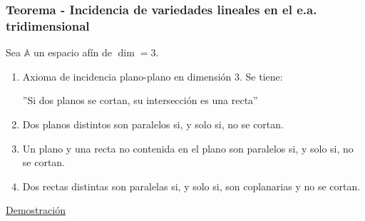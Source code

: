 \documentclass[12pt, a4paper, ones, notitlepage, openany,titlepage]{article}
\newcommand{\demostracion}{\noindent\underline{Demostración}}
\begin{document}
\subsubsection{Teorema - Incidencia de variedades lineales en el e.a. tridimensional}
Sea $\mathbb{A}$ un espacio afín de $\dim = 3$.
\begin{enumerate}[label=(\alph*)]
	\item Axioma de incidencia plano-plano en dimensión $3$. Se tiene:
	\begin{center}
		''Si dos planos se cortan, su intersección es una recta''
	\end{center}
	\item Dos planos distintos son paralelos si, y solo si, no se cortan.
	\item Un plano y una recta no contenida en el plano son paralelos si, y solo si, no se cortan.
	\item Dos rectas distintas son paralelas si, y solo si, son coplanarias y no se cortan.
\end{enumerate}
\demostracion
\end{document}

